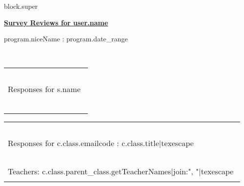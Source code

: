{%
{%
{%
{{ block.super }}
{%

{\bf {\underline {\Large Survey Reviews for {{ user.name }}} \hspace{1in} }
\vspace*{0.1in}

\normalsize {{ program.niceName }}: {{ program.date_range }} } \\

\vspace{0.3in}

{%
\vspace{0.25in}
{%
    \begin{center}
    \begin{longtable}{|p{0.48\linewidth}|p{0.48\linewidth}|} \hline
    \multicolumn{2}{|C{\linewidth}|}{\cellcolor{esphead} ~ } \\
    \multicolumn{2}{|C{\linewidth}|}{\cellcolor{esphead} \Large {Responses for {{ s.name }}} } \\ 
    \multicolumn{2}{|C{\linewidth}|}{\cellcolor{esphead} ~ } \\\hline
    {%
        {%
            {%
        {%
    {%
    \end{longtable}
    \end{center}
    {%
        \clearpage
        \begin{center}
        \begin{longtable}{|p{0.48\linewidth}|p{0.48\linewidth}|} \hline
        \multicolumn{2}{|C{\linewidth}|}{\cellcolor{esphead} ~ } \\
        \multicolumn{2}{|C{\linewidth}|}{\cellcolor{esphead} \Large {Responses for {{ c.class.emailcode }}: {{ c.class.title|texescape }}} } \\ 
        \multicolumn{2}{|C{\linewidth}|}{\cellcolor{esphead} ~ } \\\hline
        \multicolumn{2}{|C{\linewidth}|}{
            \rule{0pt}{3ex}
            Teachers: {{ c.class.parent_class.getTeacherNames|join:", "|texescape }}
            \rule[-1.5ex]{0pt}{0pt} } \\\hline
        {%
            {%
                {%
            {%
        {%
        \end{longtable}
        \end{center}
    {%
{%


}}}}}}}}}
